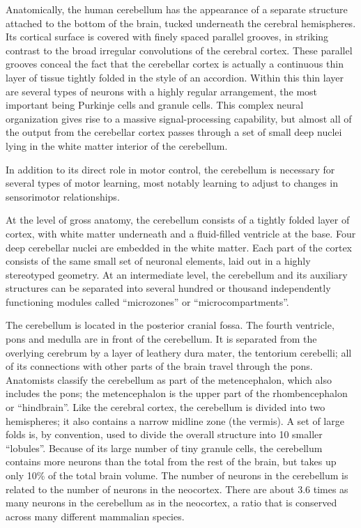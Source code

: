 \documentclass[]{book}
\begin{document}
Anatomically, the human cerebellum has the appearance of a separate structure attached to the bottom of the brain, tucked underneath the cerebral hemispheres. Its cortical surface is covered with finely spaced parallel grooves, in striking contrast to the broad irregular convolutions of the cerebral cortex. These parallel grooves conceal the fact that the cerebellar cortex is actually a continuous thin layer of tissue tightly folded in the style of an accordion. Within this thin layer are several types of neurons with a highly regular arrangement, the most important being Purkinje cells and granule cells. This complex neural organization gives rise to a massive signal-processing capability, but almost all of the output from the cerebellar cortex passes through a set of small deep nuclei lying in the white matter interior of the cerebellum.

In addition to its direct role in motor control, the cerebellum is necessary for several types of motor learning, most notably learning to adjust to changes in sensorimotor relationships.

At the level of gross anatomy, the cerebellum consists of a tightly folded layer of cortex, with white matter underneath and a fluid-filled ventricle at the base. Four deep cerebellar nuclei are embedded in the white matter. Each part of the cortex consists of the same small set of neuronal elements, laid out in a highly stereotyped geometry. At an intermediate level, the cerebellum and its auxiliary structures can be separated into several hundred or thousand independently functioning modules called ``microzones'' or ``microcompartments''.

The cerebellum is located in the posterior cranial fossa. The fourth ventricle, pons and medulla are in front of the cerebellum. It is separated from the overlying cerebrum by a layer of leathery dura mater, the tentorium cerebelli; all of its connections with other parts of the brain travel through the pons. Anatomists classify the cerebellum as part of the metencephalon, which also includes the pons; the metencephalon is the upper part of the rhombencephalon or ``hindbrain''. Like the cerebral cortex, the cerebellum is divided into two hemispheres; it also contains a narrow midline zone (the vermis). A set of large folds is, by convention, used to divide the overall structure into 10 smaller ``lobules''. Because of its large number of tiny granule cells, the cerebellum contains more neurons than the total from the rest of the brain, but takes up only 10\% of the total brain volume. The number of neurons in the cerebellum is related to the number of neurons in the neocortex. There are about 3.6 times as many neurons in the cerebellum as in the neocortex, a ratio that is conserved across many different mammalian species.
\end{document}
